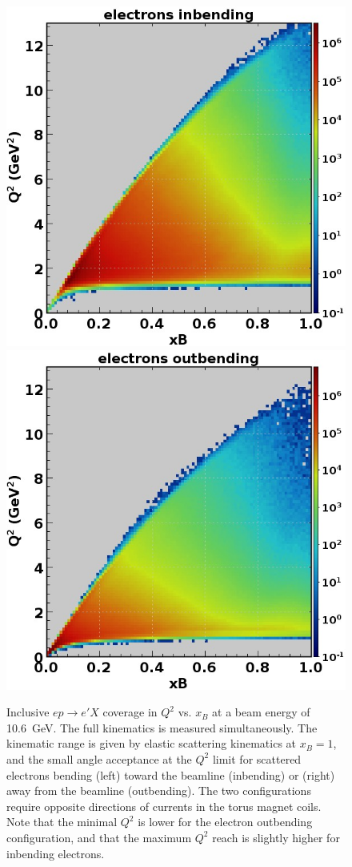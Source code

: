 \documentclass[final,3p]{elsarticle}
\begin{document}
\begin{twocolumn}
\begin{figure}[th!]
\centerline{\includegraphics[width=0.9\columnwidth]{epX-in.jpg}
\hspace{1cm}\includegraphics[width=0.9\columnwidth]{epX-out.jpg}}
\caption{Inclusive $ep \to e'X$ coverage in $Q^2$ vs. $x_B$ at a beam energy of 10.6~GeV. The full kinematics is
  measured simultaneously. The kinematic range is given by elastic scattering kinematics at $x_B = 1$, and the small
  angle acceptance at the $Q^2$ limit for scattered electrons bending (left) toward the beamline (inbending) or (right)
  away from the beamline (outbending). The two configurations require opposite directions of currents in the torus
  magnet coils. Note that the minimal $Q^2$ is lower for the electron outbending configuration, and that the maximum
  $Q^2$ reach is slightly higher for inbending electrons.} 
\label{electron-acceptance}
\end{figure}


\end{twocolumn}
\end{document}
